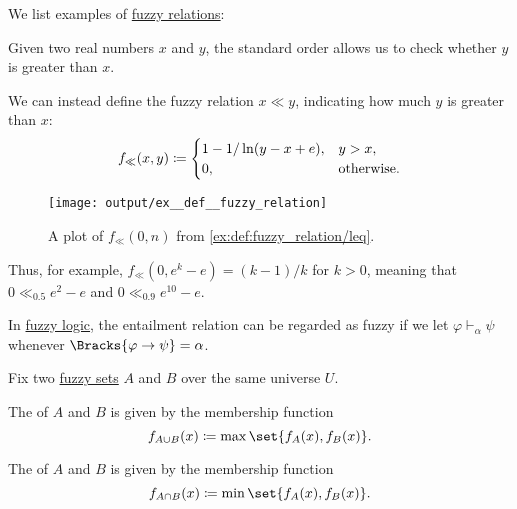 \begin{example}\label{ex:def:fuzzy_relation}
  We list examples of \hyperref[def:fuzzy_relation]{fuzzy relations}:
  \begin{thmenum}
     Given two real numbers \( x \) and \( y \), the standard order allows us to check whether \( y \) is greater than \( x \).

    We can instead define the fuzzy relation \( x \ll y \), indicating how much \( y \) is greater than \( x \):
    \begin{equation*}
      f_\ll(x, y) \coloneqq \begin{cases}
        1 - 1 / \ln(y - x + e), &y > x, \\
        0,                      &\T{otherwise.}
      \end{cases}
    \end{equation*}

    \begin{figure}[!ht]
      \centering
      \texttt{[image: output/ex\_\_def\_\_fuzzy\_relation]}
      \caption{A plot of \( f_\ll(0, n) \) from \cref{ex:def:fuzzy_relation/leq}.}\label{fig:ex:def:fuzzy_relation/leq}
    \end{figure}

    Thus, for example, \( f_\ll(0, e^k - e) = (k - 1) / k \) for \( k > 0 \), meaning that \( 0 \ll_{0.5} e^2 - e \) and \( 0 \ll_{0.9} e^{10} - e \).

     In \hyperref[def:propositional_semantics/fuzzy]{fuzzy logic}, the entailment relation can be regarded as fuzzy if we let \( \varphi \vdash_\alpha \psi \) whenever \( \Bracks{\varphi \rightarrow \psi} = \alpha \).
  \end{thmenum}
\end{example}

\begin{definition}\label{def:basic_fuzzy_set_operations}
  Fix two \hyperref[def:fuzzy_set]{fuzzy sets} \( A \) and \( B \) over the same universe \( U \).

  \begin{thmenum}
     The  of \( A \) and \( B \) is given by the membership function
    \begin{equation}\label{eq:def:basic_fuzzy_set_operations/union}
      f_{A \cup B} (x) \coloneqq \max\set{ f_A(x), f_B(x) }.
    \end{equation}

     The  of \( A \) and \( B \) is given by the membership function
    \begin{equation}\label{eq:def:basic_fuzzy_set_operations/intersection}
      f_{A \cap B} (x) \coloneqq \min\set{ f_A(x), f_B(x) }.
    \end{equation}
  \end{thmenum}
\end{definition}

